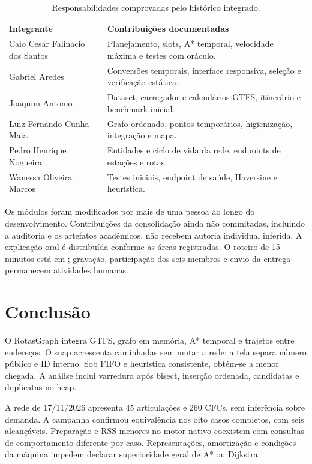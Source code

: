 \documentclass[12pt]{article}
\begin{document}
\begin{table}[ht]
\centering
\caption{Responsabilidades comprovadas pelo histórico integrado.}
\label{tab:authors}
\begin{tabularx}{\textwidth}{@{}p{}X@{}}
\toprule Integrante & Contribuições documentadas \\
\midrule
Caio Cesar Falinacio dos Santos & Planejamento, slots, A* temporal, velocidade máxima e testes com oráculo. \\
Gabriel Aredes & Conversões temporais, interface responsiva, seleção e verificação estática. \\
Joaquim Antonio & Dataset, carregador e calendários GTFS, itinerário e benchmark inicial. \\
Luiz Fernando Cunha Maia & Grafo ordenado, pontos temporários, higienização, integração e mapa. \\
Pedro Henrique Nogueira & Entidades e ciclo de vida da rede, endpoints de estações e rotas. \\
Wanessa Oliveira Marcos & Testes iniciais, endpoint de saúde, Haversine e heurística. \\
\bottomrule
\end{tabularx}
\end{table}

Os módulos foram modificados por mais de uma pessoa ao longo do desenvolvimento. Contribuições da consolidação ainda não commitadas, incluindo a auditoria e os artefatos acadêmicos, não recebem autoria individual inferida. A explicação oral é distribuída conforme as áreas registradas. O roteiro de 15 minutos está em ; gravação, participação dos seis membros e envio da entrega permanecem atividades humanas.

\section{Conclusão}
O RotasGraph integra GTFS, grafo em memória, A* temporal e trajetos entre endereços. O snap acrescenta caminhadas sem mutar a rede; a tela separa número público e ID interno. Sob FIFO e heurística consistente, obtém-se a menor chegada. A análise inclui varredura após bisect, inserção ordenada, candidatas e duplicatas no heap.

A rede de 17/11/2026 apresenta 45 articulações e 260 CFCs, sem inferência sobre demanda. A campanha confirmou equivalência nos oito casos completos, com seis alcançáveis. Preparação e RSS menores no motor nativo coexistem com consultas de comportamento diferente por caso. Representações, amortização e condições da máquina impedem declarar superioridade geral de A* ou Dijkstra.
\end{document}
